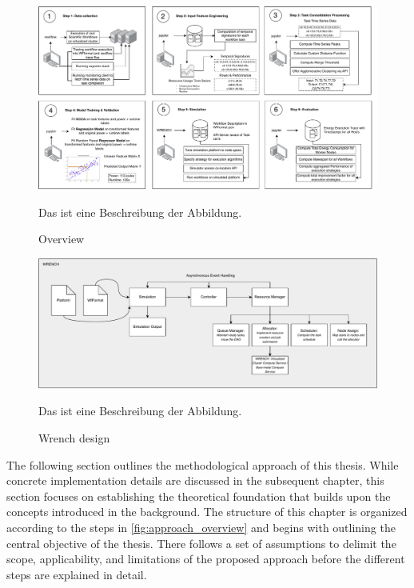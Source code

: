 \begin{figure}[H]
    \centering
    \includegraphics[scale=0.45]{fig/04/04-overview.pdf}
    \caption{Overview}
    \label{fig:04-overwiew}
    \tiny
    Das ist eine Beschreibung der Abbildung.
\end{figure}
\begin{figure}[H]
    \centering
    \includegraphics[scale=0.5]{fig/04/04-wrench-design.pdf}
    \caption{Wrench design}
    \label{fig:04-wrench-design}
    \tiny
    Das ist eine Beschreibung der Abbildung.
\end{figure}


The following section outlines the methodological approach of this thesis. While concrete implementation details are discussed in the subsequent chapter, this section focuses on establishing the theoretical foundation that builds upon the concepts introduced in the background.
The structure of this chapter is organized according to the steps in \ref{fig:approach_overview} and begins with outlining the central objective of the thesis. There follows a set of assumptions to delimit the scope, applicability, and limitations of the proposed approach before the different steps are explained in detail.

